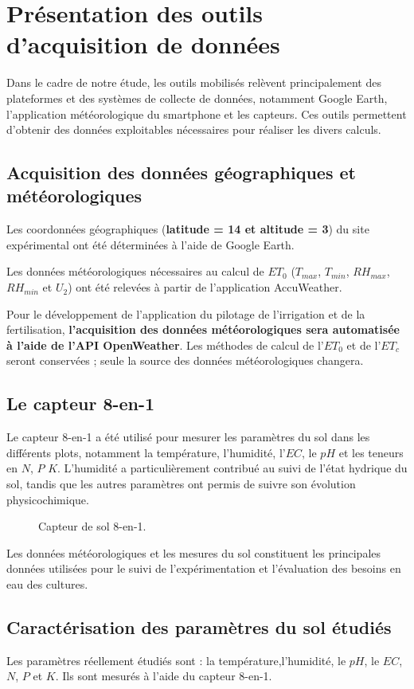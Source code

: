 \section{Présentation des outils d'acquisition de données}
Dans le cadre de notre étude, les outils mobilisés relèvent principalement des plateformes et des systèmes de collecte de données, notamment Google Earth, 
l’application météorologique du smartphone et les capteurs. Ces outils permettent d’obtenir des données exploitables nécessaires pour réaliser les divers calculs.

\subsection{Acquisition des données géographiques et météorologiques}
Les coordonnées géographiques (\textbf{latitude = 14 et altitude = 3}) du site expérimental ont été déterminées à l’aide de Google Earth.

Les données météorologiques nécessaires au calcul de $ET_0$ ($T_{max}$, $T_{min}$, $RH_{max}$, $RH_{min}$ et $U_2$) ont été relevées à partir de l’application AccuWeather.

Pour le développement de l’application du pilotage de l’irrigation et de la fertilisation, \textbf{l’acquisition des données météorologiques sera automatisée à l’aide de l’API OpenWeather}. 
Les méthodes de calcul de l’$ET_0$ et de l’$ET_c$ seront conservées ; seule la source des données météorologiques changera.

\subsection{Le capteur 8-en-1}
Le capteur 8-en-1 a été utilisé pour mesurer les paramètres du sol dans les différents plots, notamment la température, l’humidité, l'$EC$, le $pH$ et les teneurs en $N$, $P$ $K$. 
L’humidité a particulièrement contribué au suivi de l’état hydrique du sol, tandis que les autres paramètres ont permis de suivre son évolution physicochimique.

\begin{figure}[H]
    \centering
    \caption{Capteur de sol 8-en-1. }
    \label{fig:notreCapteur}
\end{figure}
Les données météorologiques et les mesures du sol constituent les principales données utilisées pour le suivi de l’expérimentation et l’évaluation des besoins en eau des cultures.

\subsection{Caractérisation des paramètres du sol étudiés}
Les paramètres réellement étudiés sont : la température,l'humidité, le $pH$, le $EC$, $N$, $P$ et $K$. Ils sont mesurés à l’aide du capteur 8-en-1.

